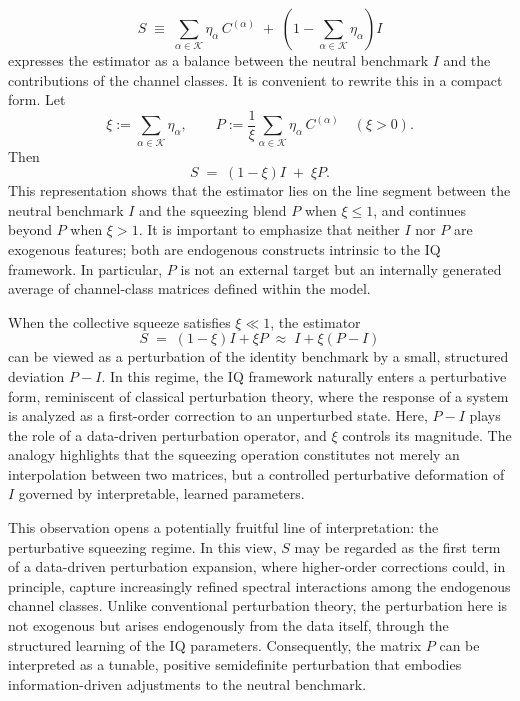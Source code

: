 \documentclass[12pt,letterpaper]{article}
\begin{document}
\begin{equation*}
S \;\equiv\; \sum_{\alpha \in \mathcal{K}} \eta_\alpha \, C^{(\alpha)}
\;+\;
\left( 1 - \sum_{\alpha \in \mathcal{K}} \eta_\alpha \right) I
\end{equation*}
expresses the estimator as a balance between the neutral benchmark \(I\) and the contributions of the channel classes. It is convenient to rewrite this in a compact form. Let
\[
\xi := \sum_{\alpha \in \mathcal{K}}\eta_\alpha, 
\qquad
P := \frac{1}{\xi}\sum_{\alpha \in \mathcal{K}}\eta_\alpha\,C^{(\alpha)} \quad (\xi>0).
\]
Then
\begin{equation}
\label{eq:impl-xi}
S \;=\; (1-\xi)I \;+\; \xi P .
\end{equation}
This representation shows that the estimator lies on the line segment between the neutral benchmark $I$ and the squeezing blend $P$ when $\xi \leq 1$, and continues beyond $P$ when $\xi > 1$. It is important to emphasize that neither $I$ nor $P$ are exogenous features; both are endogenous constructs intrinsic to the IQ framework. In particular, $P$ is not an external target but an internally generated average of channel-class matrices defined within the model.

\medskip

When the collective squeeze satisfies \(\xi \ll 1\), the estimator
\[
S \;=\; (1-\xi)I + \xi P \;\approx\; I + \xi (P - I)
\]
can be viewed as a perturbation of the identity benchmark by a small, structured deviation \(P - I\). In this regime, the IQ framework naturally enters a perturbative form, reminiscent of classical perturbation theory, where the response of a system is analyzed as a first-order correction to an unperturbed state. Here, \(P - I\) plays the role of a data-driven perturbation operator, and \(\xi\) controls its magnitude. The analogy highlights that the squeezing operation constitutes not merely an interpolation between two matrices, but a controlled perturbative deformation of \(I\) governed by interpretable, learned parameters.

\medskip

This observation opens a potentially fruitful line of interpretation: the perturbative squeezing regime. In this view, \(S\) may be regarded as the first term of a data-driven perturbation expansion, where higher-order corrections could, in principle, capture increasingly refined spectral interactions among the endogenous channel classes. Unlike conventional perturbation theory, the perturbation here is not exogenous but arises endogenously from the data itself, through the structured learning of the IQ parameters. Consequently, the matrix \(P\) can be interpreted as a tunable, positive semidefinite perturbation that embodies information-driven adjustments to the neutral benchmark. 
\end{document}
